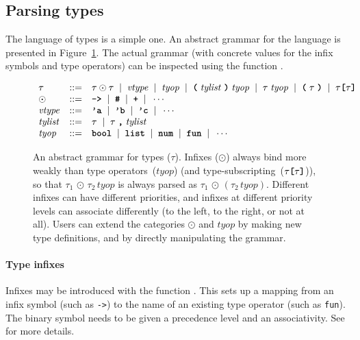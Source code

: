 \subsection{Parsing types}

The language of types is a simple one.  An abstract grammar for the
language is presented in Figure~\ref{fig:abstract-type-grammar}.  The
actual grammar (with concrete values for the infix symbols and type
operators) can be inspected using the function .
\begin{figure}[tbhp]
\newcommand{\nt}[1]{\mathit{#1}}
\newcommand{\tok}[1]{\texttt{\bfseries #1}}
\renewcommand{\bar}{\;\;|\;\;}
\[
\begin{array}{lcl}
\tau &::=& \tau \odot \tau \bar \nt{vtype} \bar \nt{tyop} \bar
           \tok{(} \;\nt{tylist}\;\tok{)} \;\nt{tyop}\bar \tau \;\nt{tyop}
           \bar \tok{(}\;\tau\;\tok{)} \bar \tau\tok{[}\tau\tok{]}\\
\odot &::=& \tok{->} \bar \tok{\#} \bar \tok{+} \bar \cdots\\
\nt{vtype} &::=& \tok{'a} \bar \tok{'b} \bar \tok{'c} \bar \cdots\\
\nt{tylist} &::=& \tau \bar \tau \;\tok{,}\;\nt{tylist}\\
\nt{tyop} &::=& \tok{bool} \bar \tok{list} \bar \tok{num} \bar
           \tok{fun} \bar \cdots
\end{array}
\]
\caption{An abstract grammar for \HOL{} types ($\tau$).  Infixes ($\odot$)
  always bind more weakly than type operators~($\nt{tyop}$) (and
  type-subscripting~($\tau\tok{[}\tau\tok{]}$)), so that
  $\tau_1 \,\odot\, \tau_2 \,\nt{tyop}$ is always parsed as $\tau_1\, \odot\,
  (\tau_2 \,\nt{tyop})$.  Different infixes can have different
  priorities, and infixes at different priority levels can associate
  differently (to the left, to the right, or not at all).  Users can
  extend the categories $\odot$ and $\nt{tyop}$ by making new type
  definitions, and by directly manipulating the grammar.}
\label{fig:abstract-type-grammar}
\end{figure}

\paragraph{Type infixes}
Infixes may be introduced with the function .
This sets up a mapping from an infix symbol (such as \texttt{->}) to
the name of an existing type operator (such as \texttt{fun}).  The
binary symbol needs to be given a precedence level and an
associativity. See \REFERENCE{} for more details.

